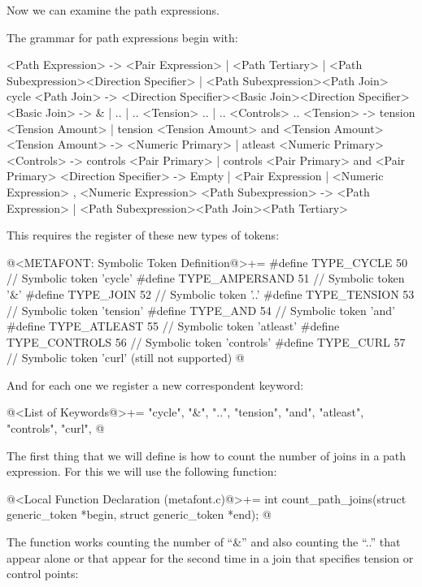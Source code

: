 Now we can examine the path expressions.


The grammar for path expressions begin with:

\alinhaverbatim
<Path Expression> -> <Pair Expression> | <Path Tertiary> |
                     <Path Subexpression><Direction Specifier> |
                     <Path Subexpression><Path Join> cycle
<Path Join> -> <Direction Specifier><Basic Join><Direction Specifier>
<Basic Join> -> & | .. | .. <Tension> .. | .. <Controls> ..
<Tension> -> tension <Tension Amount> |
             tension <Tension Amount> and <Tension Amount>
<Tension Amount> -> <Numeric Primary> | atleast <Numeric Primary>
<Controls> -> controls <Pair Primary> |
              controls <Pair Primary> and <Pair Primary>
<Direction Specifier> -> Empty |
                         { <Pair Expression } |
                         { <Numeric Expression> , <Numeric Expression> }
<Path Subexpression> -> <Path Expression> |
                        <Path Subexpression><Path Join><Path Tertiary>
\alinhanormal

This requires the register of these new types of tokens:

\iniciocodigo
@<METAFONT: Symbolic Token Definition@>+=
#define TYPE_CYCLE          50 // Symbolic token 'cycle'
#define TYPE_AMPERSAND      51 // Symbolic token '&'
#define TYPE_JOIN           52 // Symbolic token '..'
#define TYPE_TENSION        53 // Symbolic token 'tension'
#define TYPE_AND            54 // Symbolic token 'and'
#define TYPE_ATLEAST        55 // Symbolic token 'atleast'
#define TYPE_CONTROLS       56 // Symbolic token 'controls'
#define TYPE_CURL           57 // Symbolic token 'curl' (still not supported)
@
\fimcodigo

And for each one we register a new correspondent keyword:

\iniciocodigo
@<List of Keywords@>+=
"cycle", "&", "..", "tension", "and", "atleast", "controls", "curl",
@
\fimcodigo

The first thing that we will define is how to count the number of
joins in a path expression. For this we will use the following
function:

\iniciocodigo
@<Local Function Declaration (metafont.c)@>+=
int count_path_joins(struct generic_token *begin, struct generic_token *end);
@
\fimcodigo

The function works counting the number of ``\&'' and also counting the
``..'' that appear alone or that appear for the second time in a join
that specifies tension or control points:

